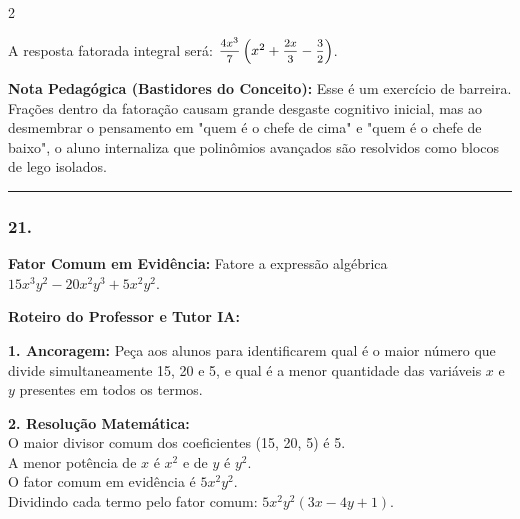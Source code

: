 \begin{multicols*}{2}
\begin{tcolorbox}[colback=CorTitUm!5, colframe=CorTitUm, boxrule=1pt, arc=4pt, left=6pt, right=6pt, top=6pt, bottom=6pt]
    A resposta fatorada integral será:
    $ \mfrac{4x^3}{7} \left( x^2 + \mfrac{2x}{3} - \mfrac{3}{2} \right) $.
    \end{tcolorbox}
    \vspace{0.15cm}
    
    \begin{boxexplicacao}
    \textbf{Nota Pedagógica (Bastidores do Conceito):} Esse é um exercício de barreira. Frações dentro da fatoração causam grande desgaste cognitivo inicial, mas ao desmembrar o pensamento em "quem é o chefe de cima" e "quem é o chefe de baixo", o aluno internaliza que polinômios avançados são resolvidos como blocos de lego isolados.
    \end{boxexplicacao}
\fi

\par\vspace{\espacoQuestao}

\noindent\textcolor{CorLinha}{\rule{\linewidth}{0.5pt}} 
\par\vspace{\espacoPreQuestao}
\subsubsection*{21.} 
\begin{enunciadoLiteral}
\textbf{Fator Comum em Evidência:} Fatore a expressão algébrica $15x^3y^2 - 20x^2y^3 + 5x^2y^2$.
\end{enunciadoLiteral}

\ifgabarito
    \begin{tcolorbox}[colback=CorTitUm!5, colframe=CorTitUm, boxrule=1pt, arc=4pt, left=6pt, right=6pt, top=6pt, bottom=6pt]
    \small\textbf{\textcolor{CorTitUm}{Roteiro do Professor e Tutor IA:}}\par\vspace{0.1cm}
    \color{CinzaEscuro}
    \textbf{1. Ancoragem:} Peça aos alunos para identificarem qual é o maior número que divide simultaneamente 15, 20 e 5, e qual é a menor quantidade das variáveis $x$ e $y$ presentes em todos os termos.\par\vspace{0.1cm}
    \textbf{2. Resolução Matemática:}\\
    O maior divisor comum dos coeficientes (15, 20, 5) é 5.\\
    A menor potência de $x$ é $x^2$ e de $y$ é $y^2$.\\
    O fator comum em evidência é $5x^2y^2$.\\
    Dividindo cada termo pelo fator comum: $5x^2y^2(3x - 4y + 1)$.
    \end{tcolorbox}
    \vspace{0.15cm}
    

\end{multicols*}
